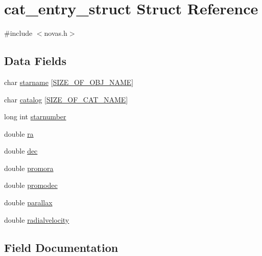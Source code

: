 \hypertarget{structcat__entry__struct}{}\section{cat\+\_\+entry\+\_\+struct Struct Reference}
\label{structcat__entry__struct}


{\ttfamily \#include $<$novas.\+h$>$}

\subsection*{Data Fields}
\begin{DoxyCompactItemize}
\item 
char \mbox{\hyperlink{structcat__entry__struct_ad26c9b08b1028d2a7f35c447841022b1}{starname}} \mbox{[}\mbox{\hyperlink{novas_8h_a977a43db51d544f728ea8a22b4a53783}{S\+I\+Z\+E\+\_\+\+O\+F\+\_\+\+O\+B\+J\+\_\+\+N\+A\+ME}}\mbox{]}
\item 
char \mbox{\hyperlink{structcat__entry__struct_a128c876f7e50045e1c469dbabb400c58}{catalog}} \mbox{[}\mbox{\hyperlink{novas_8h_af32c72297e36b77bead56044d23082f7}{S\+I\+Z\+E\+\_\+\+O\+F\+\_\+\+C\+A\+T\+\_\+\+N\+A\+ME}}\mbox{]}
\item 
long int \mbox{\hyperlink{structcat__entry__struct_a2177a56006e4a3ddc8961e2b4571978e}{starnumber}}
\item 
double \mbox{\hyperlink{structcat__entry__struct_a713a0c71a86d92fa6892fdb2cb7c9422}{ra}}
\item 
double \mbox{\hyperlink{structcat__entry__struct_ac4ae7989694321b540abb75c30eec690}{dec}}
\item 
double \mbox{\hyperlink{structcat__entry__struct_ab9301cf1c67c13114b22950650b17789}{promora}}
\item 
double \mbox{\hyperlink{structcat__entry__struct_acf4bdbac6c1d059a4db3ed879f32f21c}{promodec}}
\item 
double \mbox{\hyperlink{structcat__entry__struct_a18f7f3626661dbf57ce9eaec51840eb8}{parallax}}
\item 
double \mbox{\hyperlink{structcat__entry__struct_aa2b5e5ca3a5df1765b49a6c6b110a36a}{radialvelocity}}
\end{DoxyCompactItemize}


\subsection{Field Documentation}
\mbox{\label{structcat__entry__struct_a128c876f7e50045e1c469dbabb400c58}} 

